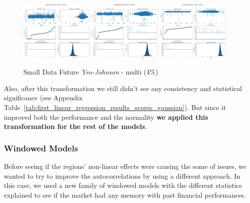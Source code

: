 \documentclass[11pt,english,a4paper,hidelinks]{book}
\begin{document}
\begin{figure}[H]
    \centering
    \includegraphics[width=0.32\textwidth]{images/code/models/linear_regression/first_model/Multi/quality_profit_1m_residuals - Gaussian.png}
    \includegraphics[width=0.32\textwidth]{images/code/models/linear_regression/first_model/Multi/quality_profit_1y_residuals - Gaussian.png}
    \includegraphics[width=0.32\textwidth]{images/code/models/linear_regression/first_model/Multi/quality_profit_5y_residuals - Gaussian.png}
    \caption{Small Data Future \textit{Yeo-Johnson} - \acrshort{multi} (4\%)}
    \label{fig:first_linear_regression_gaussian_residuals}
\end{figure}

\noindent Also, after this transformation we still didn't see any consistency and statistical significance (see Appendix Table~\ref{tab:first_linear_regression_results_scores_gaussian}). But since it improved both the performance and the normality \textbf{we applied this transformation for the rest of the models}.

\subsubsection{Windowed Models}

\noindent Before seeing if the regions' non-linear effects were causing the some of issues, we wanted to try to improve the autocorrelations by using a different approach. In this case, we used a new family of windowed models with the different statistics explained to see if the market had any memory with past financial performances.
\end{document}
